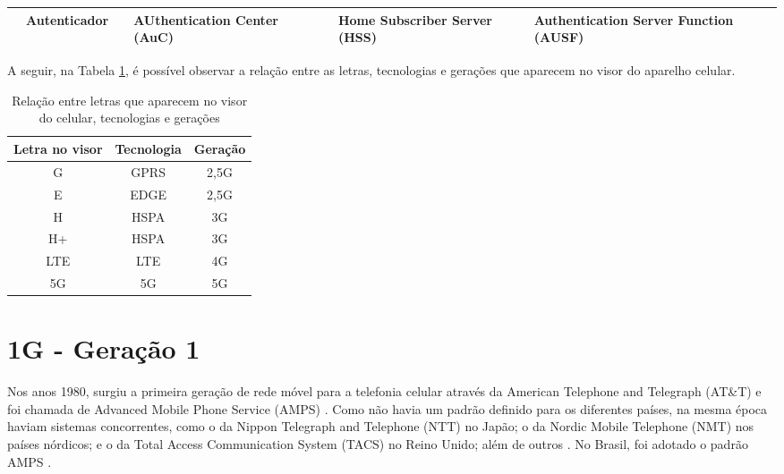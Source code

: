 \documentclass[11pt,oneside,a4paper]{abntex2}
\begin{document}
\begin{center}
\begin{longtable}{|m{1.5cm}|m{2.5cm}|l|m{2cm}|m{2cm}|m{2cm}|m{2cm}|}
                        & Autenticador                           &    & AUthentication Center (AuC)              &                                                                                             & Home Subscriber Server (HSS)                                    & Authentication Server Function (AUSF)                                                                                                       \\ \hline
\end{longtable}
\end{center}

A seguir, na Tabela \ref{sopa-letrinhas-2}, é possível observar a relação entre as letras, tecnologias e gerações que aparecem no visor do aparelho celular.

\begin{table}
\caption{Relação entre letras que aparecem no visor do celular, tecnologias e gerações}
\label{sopa-letrinhas-2}
\begin{center}
\begin{tabular}{||c||c||c||}
	\hline
	\textbf{Letra no visor} & \textbf{Tecnologia} & \textbf{Geração} \\
	\hline
	\hline
	G & GPRS & 2,5G \\
	\hline
	E & EDGE & 2,5G \\
	\hline
	H & HSPA & 3G \\
	\hline
	H+ & HSPA & 3G \\
	\hline
	LTE & LTE & 4G \\
	\hline
	5G & 5G & 5G \\
	\hline
\end{tabular}
\end{center}
\end{table}

\section*{1G - Geração 1}
\label{1g}

Nos anos 1980, surgiu a primeira geração de rede móvel para a telefonia celular através da American Telephone and Telegraph (AT\&T) e foi chamada de Advanced Mobile Phone Service (AMPS) \cite{tcc1}. Como não havia um padrão definido para os diferentes países, na mesma época haviam sistemas concorrentes, como o da Nippon Telegraph and Telephone (NTT) no Japão; o da Nordic Mobile Telephone (NMT) nos países nórdicos; e o da Total Access Communication System (TACS) no Reino Unido; além de outros \cite{wiki-1g-br, wiki-1g-en}. No Brasil, foi adotado o padrão AMPS \cite{tcc2}.
\end{document}
